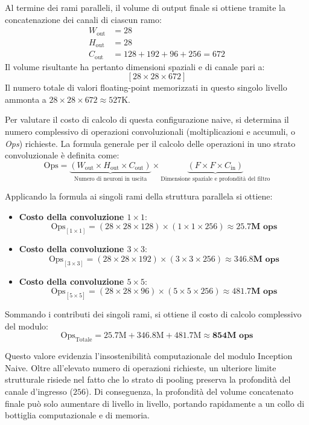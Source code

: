 ﻿\documentclass[11pt, a4paper]{article}
\begin{document}
Al termine dei rami paralleli, il volume di output finale si ottiene tramite la concatenazione dei canali di ciascun ramo:
\begin{align*}
W_{\text{out}} &= 28 \\
H_{\text{out}} &= 28 \\
C_{\text{out}} &= 128 + 192 + 96 + 256 = 672
\end{align*}
Il volume risultante ha pertanto dimensioni spaziali e di canale pari a:
\[
\boxed{[28 \times 28 \times 672]}
\]
Il numero totale di valori floating-point memorizzati in questo singolo livello ammonta a $28 \times 28 \times 672 \approx 527\text{K}$.

Per valutare il costo di calcolo di questa configurazione naive, si determina il numero complessivo di operazioni convoluzionali (moltiplicazioni e accumuli, o \emph{Ops}) richieste. La formula generale per il calcolo delle operazioni in uno strato convoluzionale è definita come:
\[
\text{Ops} = \underbrace{(W_{\text{out}} \times H_{\text{out}} \times C_{\text{out}})}_{\text{Numero di neuroni in uscita}} \times \underbrace{(F \times F \times C_{\text{in}})}_{\text{Dimensione spaziale e profondità del filtro}}
\]

Applicando la formula ai singoli rami della struttura parallela si ottiene:
\begin{itemize}
    \item \textbf{Costo della convoluzione $1 \times 1$}:
    \[
    \text{Ops}_{[1 \times 1]} = (28 \times 28 \times 128) \times (1 \times 1 \times 256) \approx \mathbf{25.7\text{M ops}}
    \]
    \item \textbf{Costo della convoluzione $3 \times 3$}:
    \[
    \text{Ops}_{[3 \times 3]} = (28 \times 28 \times 192) \times (3 \times 3 \times 256) \approx \mathbf{346.8\text{M ops}}
    \]
    \item \textbf{Costo della convoluzione $5 \times 5$}:
    \[
    \text{Ops}_{[5 \times 5]} = (28 \times 28 \times 96) \times (5 \times 5 \times 256) \approx \mathbf{481.7\text{M ops}}
    \]
\end{itemize}

Sommando i contributi dei singoli rami, si ottiene il costo di calcolo complessivo del modulo:
\[
\text{Ops}_{\text{Totale}} = 25.7\text{M} + 346.8\text{M} + 481.7\text{M} \approx \mathbf{854\text{M ops}}
\]

Questo valore evidenzia l'insostenibilità computazionale del modulo Inception Naive. Oltre all'elevato numero di operazioni richieste, un ulteriore limite strutturale risiede nel fatto che lo strato di pooling preserva la profondità del canale d'ingresso ($256$). Di conseguenza, la profondità del volume concatenato finale può solo aumentare di livello in livello, portando rapidamente a un collo di bottiglia computazionale e di memoria.
\end{document}
